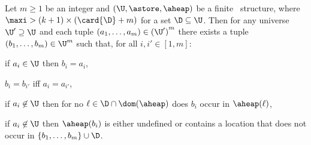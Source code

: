 \begin{lemma}\label{lemma:non-controlled-model}
  Let $m\geq1$ be an integer and $(\U,\astore,\aheap)$ be a finite
  \ncontrolled\ structure, where $\maxi > (k+1) \times (\card{\D}+m)$
  for a set $\D \subseteq \U$. Then for any universe $\U' \supseteq
  \U$ and each tuple $(a_1,\ldots,a_m) \in {(\U')}^m$ there exists a
  tuple $(b_1,\ldots,b_m) \in \U^m$ such that, for all $i,i'\in[1,m]$:
  \begin{compactenum}
  \item\label{b:condeqx} if $a_i \in \U$ then $b_i = a_i$,
  \item\label{b:condeqy} $b_i = b_{i'}$ iff $a_i = a_{i'}$,
  \item\label{b:condx} if $a_i \not \in \U$ then for no $\ell \in \D
    \cap \dom(\aheap)$ does $b_i$ occur in $\aheap(\ell)$,
  \item\label{b:condy} if $a_i \not \in \U$ then $\aheap(b_i)$ is
    either undefined or contains a location that does not occur in $\{
    b_1,\dots,b_m \} \cup \D$.
  \end{compactenum}
\end{lemma}
